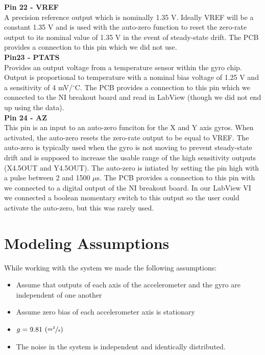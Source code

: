 \documentclass{article}
\theoremstyle{plain}
\theoremstyle{definition}
\theoremstyle{remark}
\begin{document}
\textbf{Pin 22 - VREF}\\
A precision reference output which is nominally 1.35 V. Ideally VREF will be a constant 1.35 V and is used with the auto-zero function to reset the zero-rate output to its nominal value of 1.35 V in the event of steady-state drift. The PCB provides a connection to this pin which we did not use.\\

\textbf{Pin23 - PTATS}\\
Provides an output voltage from a temperature sensor within the gyro chip. Output is proportional to temperature with a nominal bias voltage of 1.25 V and a sensitivity of 4 mV/$^{\circ}$C. The PCB provides a connection to this pin which we connected to the NI breakout board and read in LabView (though we did not end up using the data).\\

\textbf{Pin 24 - AZ}\\
This pin is an input to an auto-zero funciton for the X and Y axis gyros. When activated, the auto-zero resets the zero-rate output to be equal to VREF. The auto-zero is typically used when the gyro is not moving to prevent steady-state drift and is supposed to increase the usable range of the high sensitivity outputs (X4.5OUT and Y4.5OUT). The auto-zero is intiated by setting the pin high with a pulse between 2 and 1500 $\mu$s. The PCB provides a connection to this pin with we connected to a digital output of the NI breakout board. In our LabView VI we connected a boolean momentary switch to this output so the user could activate the auto-zero, but this was rarely used.\\ 

\section{Modeling Assumptions}
While working with the system we made the following assumptions:
\begin{itemize}
\item{Assume that outputs of each axis of the accelerometer and the gyro are independent of one another}
\item{Assume zero bias of each accelerometer axis is stationary} %
\item{$g = 9.81 \, \left( \sfrac{m^2}{s}\right) $}
\item The noise in the system is independent and identically distributed.
\end{itemize}
\end{document}
